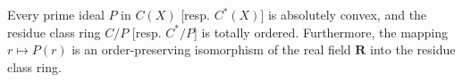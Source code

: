 Every prime ideal $P$ in $C(X)$ [resp. $C^*(X)$] is absolutely convex, and the residue class ring $C/P$ [resp. $C^*/P$] is totally ordered. Furthermore, the mapping $r \mapsto P(r)$ is an order-preserving isomorphism of the real field $\mathbf{R}$ into the residue class ring.
